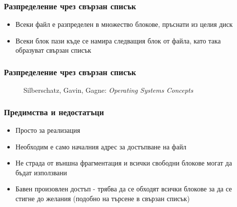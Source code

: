 \documentclass[ignorenonframetext, hyperref=unicode]{beamer}
\begin{document}
\begin{frame}
\frametitle{Разпределение чрез свързан списък}
\begin{itemize}
  \item Всеки файл е разпределен в множество блокове, пръснати из целия диск
  \item Всеки блок пази къде се намира следващия блок от файла, като така образуват свързан списък
\end{itemize}
\end{frame}

\begin{frame}
\frametitle{Разпределение чрез свързан списък}
\begin{figure}[h]
\center
{}
\caption{Silberschatz, Gavin, Gagne: {\em Operating Systems Concepts}}
\end{figure}
\end{frame}

\begin{frame}
\frametitle{Предимства и недостатъци}
\begin{itemize}
  \item Просто за реализация
  \item Необходим е само началния адрес за достъпване на файл
  \item Не страда от външна фрагментация и всички свободни блокове могат да бъдат използвани
  \item Бавен произовлен достъп - трябва да се обходят всички блокове за да се стигне до желания (подобно на търсене в свързан списък)
\end{itemize}
\end{frame}
\end{document}
